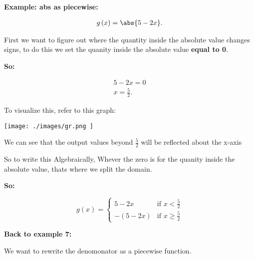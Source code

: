 \documentclass{report}
\begin{document}
    \bigbreak \noindent 
    \begin{large}
       \textbf{Example: abs as piecewise:} 
    \end{large}

    \begin{align*}
        g \left(x\right) = \abs{5-2x}
    .\end{align*}

    \bigbreak \noindent 
    First we want to figure out where the quantity inside the absolute value changes signs,
    to do this we set the quanity inside the absolute value \textbf{equal to 0}.
    
    \bigbreak \noindent 
    \textbf{So:}

    \begin{align*}
        5-2x=0 \\
        x= \frac{5}{2} 
    .\end{align*}

    \bigbreak \noindent 
    To visualize this, refer to this graph:

    \bigbreak \noindent 
    \begin{center}
        \texttt{[image: ./images/gr.png  ]}
    \end{center}

    \bigbreak \noindent \bigbreak \noindent
    We can see that the output values beyond $\frac{5}{2}$ will be reflected about the x-axis
    
    \bigbreak \noindent 
    So to write this Algebraically, Whever the zero is for the quanity inside the absolute value, 
    thats where we split the domain.

    \bigbreak \noindent 
    \textbf{So:}

    \bigbreak \noindent 
       \begin{equation}
        g(x)=
            \begin{cases}
                5-2x  & \text{if } x < \displaystyle{\frac{5}{2}} \\ 
                - \left(5-2x\right)      & \text{if } \displaystyle{ x \geq \frac{5}{2}} 
            \end{cases}
        \end{equation}

        \bigbreak \noindent 
        \begin{large}
           \textbf{Back to example 7:} 
        \end{large}
        
        \bigbreak \noindent 
        We want to rewrite the denomonator as a piecewise function.
\end{document}
